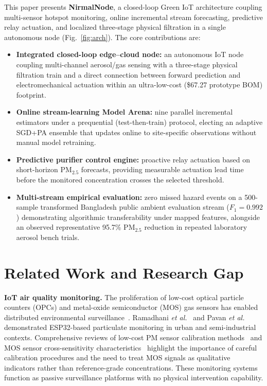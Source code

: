\documentclass[12pt,a4paper]{article}
\newcommand{\etal}{\textit{et al.}}
\newcommand{\pmtf}{PM$_{2.5}$}
\begin{document}
This paper presents \textbf{NirmalNode}, a closed-loop Green IoT architecture coupling
multi-sensor hotspot monitoring, online incremental stream forecasting, predictive
relay actuation, and localized three-stage physical filtration in a single autonomous
node (Fig.~\ref{fig:arch}). The core contributions are:
\begin{itemize}[leftmargin=*,topsep=2pt,itemsep=1pt]
  \item \textbf{Integrated closed-loop edge--cloud node:} an autonomous IoT node coupling
    multi-channel aerosol/gas sensing with a three-stage physical filtration train and
    a direct connection between forward prediction and electromechanical actuation within
    an ultra-low-cost (\$67.27 prototype BOM) footprint.
  \item \textbf{Online stream-learning Model Arena:} nine parallel incremental estimators
    under a prequential (test-then-train) protocol, electing an adaptive SGD+PA ensemble
    that updates online to site-specific observations without manual model retraining.
  \item \textbf{Predictive purifier control engine:} proactive relay actuation based on
    short-horizon PM$_{2.5}$ forecasts, providing measurable actuation lead time before
    the monitored concentration crosses the selected threshold.
  \item \textbf{Multi-stream empirical evaluation:} zero missed hazard events on a
    500-sample transformed Bangladesh public ambient evaluation stream ($F_1=0.992$) demonstrating
    algorithmic transferability under mapped features, alongside an observed representative 95.7\% \pmtf{}
    reduction in repeated laboratory aerosol bench trials.
\end{itemize}


\section{Related Work and Research Gap}
\label{sec:related}

\textbf{IoT air quality monitoring.} The proliferation of low-cost optical particle counters
(OPCs) and metal-oxide semiconductor (MOS) gas sensors has enabled distributed environmental
surveillance~\citep{shabbir2025paradigm,alam2025iot}. Ramadhani \etal{}~\citep{ramadhani2025iot}
and Pavan \etal{}~\citep{pavan2025realtime} demonstrated ESP32-based particulate monitoring in
urban and semi-industrial contexts. Comprehensive reviews of low-cost PM sensor calibration
methods~\citep{lowcostpm2025acs,sensorcorrection2025npj} and MOS sensor cross-sensitivity
characteristics~\citep{mos2024trac} highlight the importance of careful calibration procedures
and the need to treat MOS signals as qualitative indicators rather than reference-grade
concentrations. These monitoring systems function as passive surveillance platforms with no
physical intervention capability.
\end{document}
